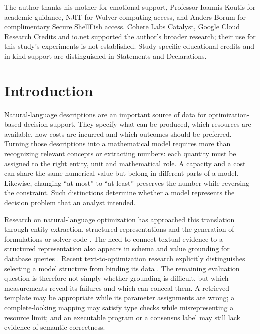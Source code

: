 \documentclass[pdflatex,iicol,sn-basic,Numbered]{sn-jnl}
\begin{document}
\maketitle
\noindent{}



The author thanks his mother for emotional support, Professor Ioannis Koutis for academic guidance, NJIT for Wulver computing access, and Anders Borum for complimentary Secure ShellFish access. Cohere Labs Catalyst, Google Cloud Research Credits and io.net supported the author's broader research; their use for this study's experiments is not established. Study-specific educational credits and in-kind support are distinguished in Statements and Declarations.

\section{Introduction}

Natural-language descriptions are an important source of data for optimization-based decision support. They specify what can be produced, which resources are available, how costs are incurred and which outcomes should be preferred. Turning those descriptions into a mathematical model requires more than recognizing relevant concepts or extracting numbers: each quantity must be assigned to the right entity, unit and mathematical role. A capacity and a cost can share the same numerical value but belong in different parts of a model. Likewise, changing ``at most'' to ``at least'' preserves the number while reversing the constraint. Such distinctions determine whether a model represents the decision problem that an analyst intended.

Research on natural-language optimization has approached this translation through entity extraction, structured representations and the generation of formulations or solver code \cite{ramamonjison2022autoformulation,ramamonjison2023nl4opt,kadioglu2024ner4opt,ahmaditeshnizi2024optimus_icml}. The need to connect textual evidence to a structured representation also appears in schema and value grounding for database queries \cite{deng2021strug}. Recent text-to-optimization research explicitly distinguishes selecting a model structure from binding its data \cite{gao2026models}. The remaining evaluation question is therefore not simply whether grounding is difficult, but which measurements reveal its failures and which can conceal them. A retrieved template may be appropriate while its parameter assignments are wrong; a complete-looking mapping may satisfy type checks while misrepresenting a resource limit; and an executable program or a consensus label may still lack evidence of semantic correctness.
\end{document}
